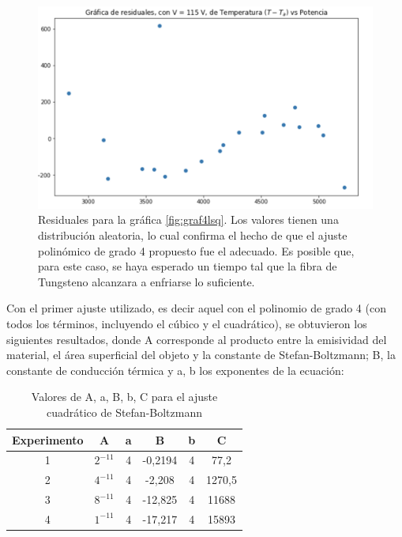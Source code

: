 \documentclass[%
 reprint,
 amsmath,amssymb,
 aps,
]{revtex4-1}
\begin{document}
\begin{figure}[H]
    \centering
    \includegraphics[scale= 0.3]{graf4res.png}
    \caption{Residuales para la gráfica \ref{fig:graf4lsq}. Los valores tienen una distribución aleatoria, lo cual confirma el hecho de que el ajuste polinómico de grado 4 propuesto fue el adecuado. Es posible que, para este caso, se haya esperado un tiempo tal que la fibra de Tungsteno alcanzara a enfriarse lo suficiente.} 
    \label{fig:Figura 2}
\end{figure}

Con el primer ajuste utilizado, es decir aquel con el polinomio de grado 4 (con todos los términos, incluyendo el cúbico y el cuadrático), se obtuvieron los siguientes resultados, donde A corresponde al producto entre la emisividad del material, el área superficial del objeto y la constante de Stefan-Boltzmann; B, la constante de conducción térmica y a, b los exponentes de la ecuación:

\begin{table}[H]
  \centering
  \caption{Valores de A, a, B, b, C para el ajuste cuadrático de Stefan-Boltzmann}
    \begin{tabular}{|c|c|c|c|c|c|}
    \hline
    Experimento & A     & a     & B     & b & C \\
    \hline
    1     & $2^{-11}$ & 4     & -0,2194 & 4 & 77,2 \\
    \hline
    2     & $4^{-11}$ & 4     & -2,208 & 4 & 1270,5 \\
    \hline
    3     & $8^{-11}$ & 4     & -12,825 & 4 & 11688 \\
    \hline
    4     & $1^{-11}$ & 4     & -17,217 & 4 & 15893\\
    \hline
    \end{tabular}%
  \label{tab:addlabel}%
\end{table}%
\end{document}
